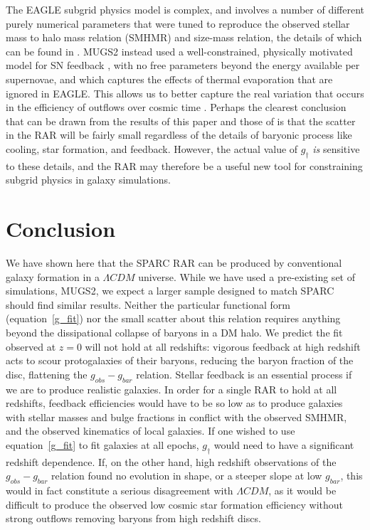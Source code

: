 The EAGLE subgrid physics model is complex, and involves a number of different
purely numerical parameters that were tuned to reproduce the observed stellar
mass to halo mass relation (SMHMR) and size-mass relation, the details of which
can be found in \citet{Crain2015}.  MUGS2 instead used a well-constrained,
physically motivated model for SN feedback \citep{Keller2014}, with no free
parameters beyond the energy available per supernovae, and which captures the
effects of thermal evaporation that are ignored in EAGLE.  This allows us to
better capture the real variation that occurs in the efficiency of outflows over
cosmic time \citep{Keller2015,Muratov2015}.  Perhaps the clearest conclusion
that can be drawn from the results of this paper and those of \citet{Ludlow2016}
is that the scatter in the RAR will be fairly small regardless of the details of
baryonic process like cooling, star formation, and feedback.  However, the
actual value of $g_\dagger$ {\it is} sensitive to these details, and the RAR may
therefore be a useful new tool for constraining subgrid physics in galaxy
simulations.

\section{Conclusion}
We have shown here that the SPARC RAR can be produced by conventional galaxy
formation in a $\Lambda CDM$ universe.  While we have used a pre-existing set of
simulations, MUGS2, we expect a larger sample designed to match SPARC should
find similar results.  Neither the particular functional form
(equation~\ref{g_fit}) nor the small scatter about this relation requires
anything beyond the dissipational collapse of baryons in a DM halo.  We predict
the fit observed at $z=0$ will not hold at all redshifts: vigorous feedback at
high redshift acts to scour protogalaxies of their baryons, reducing the baryon
fraction of the disc, flattening the $g_{obs}-g_{bar}$ relation.  Stellar
feedback is an essential process if we are to produce realistic galaxies.  In
order for a single RAR to hold at all redshifts, feedback efficiencies would
have to be so low as to produce galaxies with stellar masses and bulge fractions
in conflict with the observed SMHMR, and the observed kinematics of local
galaxies. If one wished to use equation~\ref{g_fit} to fit galaxies at all
epochs, $g_\dagger$ would need to have a significant redshift dependence.  If,
on the other hand, high redshift observations of the $g_{obs}-g_{bar}$ relation
found no evolution in shape, or a steeper slope at low $g_{bar}$, this would in
fact constitute a serious disagreement with $\Lambda CDM$, as it would be
difficult to produce the observed low cosmic star formation efficiency without
strong outflows removing baryons from high redshift discs.

